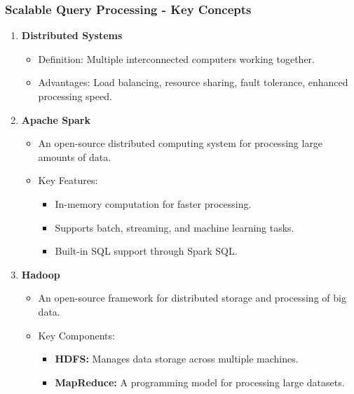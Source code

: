 \documentclass[aspectratio=169]{beamer}
\begin{document}
\begin{frame}[fragile]
    \frametitle{Scalable Query Processing - Key Concepts}
    \begin{enumerate}
        \item \textbf{Distributed Systems}
            \begin{itemize}
                \item Definition: Multiple interconnected computers working together.
                \item Advantages: Load balancing, resource sharing, fault tolerance, enhanced processing speed.
            \end{itemize}
        
        \item \textbf{Apache Spark}
            \begin{itemize}
                \item An open-source distributed computing system for processing large amounts of data.
                \item Key Features:
                    \begin{itemize}
                        \item In-memory computation for faster processing.
                        \item Supports batch, streaming, and machine learning tasks.
                        \item Built-in SQL support through Spark SQL.
                    \end{itemize}
            \end{itemize}
        
        \item \textbf{Hadoop}
            \begin{itemize}
                \item An open-source framework for distributed storage and processing of big data.
                \item Key Components:
                    \begin{itemize}
                        \item \textbf{HDFS:} Manages data storage across multiple machines.
                        \item \textbf{MapReduce:} A programming model for processing large datasets.
                    \end{itemize}
            \end{itemize}
    \end{enumerate}
\end{frame}
\end{document}
